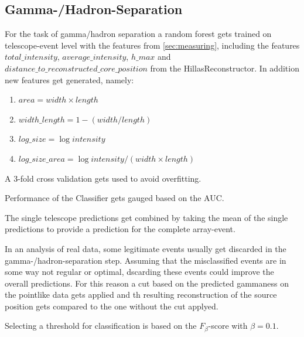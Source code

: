 \subsection{Gamma-/Hadron-Separation}
\label{sec:gh_sep}

For the task of gamma/hadron separation a random forest gets trained
on telescope-event level with the features from \ref{sec:measuring}, including
the features $total\_intensity$, $average\_intensity$, $h\_max$
and $distance\_to\_reconstructed\_core\_position$ from the
HillasReconstructor.
In addition new features get generated, namely:

\begin{enumerate}
    \item $area = width \times length$
    \item $width\_length = 1 - (width/length)$
    \item $log\_size = \log{intensity}$
    \item $log\_size\_area = \log{intensity} / (width \times length)$
\end{enumerate}

A 3-fold cross validation gets used to avoid overfitting.

Performance of the Classifier gets gauged based 
on the AUC.

The single telescope predictions get combined by
taking the mean of the single
predictions to provide a prediction for the complete array-event.

In an analysis of real data, some legitimate events usually get discarded
in the gamma-/hadron-separation step.
Assuming that the misclassified events are in some way not regular or optimal, 
dscarding these events could improve the overall predictions.
For this reason a cut based on the predicted gammaness on the pointlike data
gets applied
and th resulting reconstruction of the source position 
gets compared to the one without the cut applyed.

Selecting a threshold for classification is based on
the $F_{\beta}$-score with $\beta = 0.1$.


